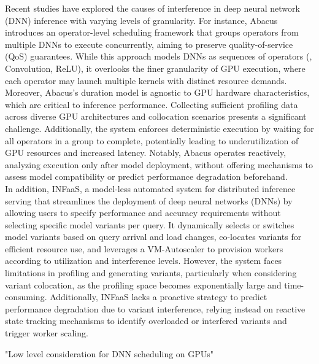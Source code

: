 Recent studies have explored the causes of interference in deep neural network (DNN) inference with varying levels of granularity. For instance, Abacus introduces an operator-level scheduling framework that groups operators from multiple DNNs to execute concurrently, aiming to preserve quality-of-service (QoS) guarantees. While this approach models DNNs as sequences of operators (\eg, Convolution, ReLU), it overlooks the finer granularity of GPU execution, where each operator may launch multiple kernels with distinct resource demands. Moreover, Abacus's duration model is agnostic to GPU hardware characteristics, which are critical to inference performance. Collecting sufficient profiling data across diverse GPU architectures and collocation scenarios presents a significant challenge. Additionally, the system enforces deterministic execution by waiting for all operators in a group to complete, potentially leading to underutilization of GPU resources and increased latency. Notably, Abacus operates reactively, analyzing execution only after model deployment, without offering mechanisms to assess model compatibility or predict performance degradation beforehand.\\
In addition, INFaaS, a model-less automated system for distributed inference serving that streamlines the deployment of deep neural networks (DNNs) by allowing users to specify performance and accuracy requirements without selecting specific model variants per query. It dynamically selects or switches model variants based on query arrival and load changes, co-locates variants for efficient resource use, and leverages a VM-Autoscaler to provision workers according to utilization and interference levels. However, the system faces limitations in profiling and generating variants, particularly when considering variant colocation, as the profiling space becomes exponentially large and time-consuming. Additionally, INFaaS lacks a proactive strategy to predict performance degradation due to variant interference, relying instead on reactive state tracking mechanisms to identify overloaded or interfered variants and trigger worker scaling.

"Low level consideration for DNN scheduling on GPUs"


